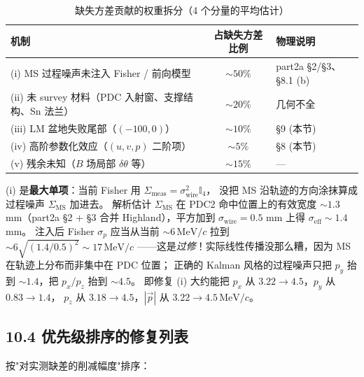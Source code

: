 \begin{table}[ht]
  \centering\small
  \caption{缺失方差贡献的权重拆分（4 个分量的平均估计）}
  \label{tab:partIIc:budget:missing-decomp}
  \begin{tabular}{l|c|l}
    \hline
    机制 & 占缺失方差比例 & 物理说明 \\
    \hline
    (i) MS 过程噪声未注入 Fisher / 前向模型     & $\sim 50\%$ & part2a §2/§3、§8.1 (b) \\
    (ii) 未 survey 材料（PDC 入射窗、支撑结构、Sn 法兰） & $\sim 20\%$ & 几何不全 \\
    (iii) LM 盆地失败尾部（$(-100, 0)$）        & $\sim 10\%$ & §9 (本节) \\
    (iv) 高阶参数化效应（$(u,v,p)$ 二阶项）      & $\sim 5\%$ & §8 (本节) \\
    (v) 残余未知（$B$ 场局部 $\delta\theta$ 等） & $\sim 15\%$ & --- \\
    \hline
  \end{tabular}
\end{table}

(i) 是\textbf{最大单项}：当前 Fisher 用 $\Sigma_\mathrm{meas} = \sigma_\mathrm{wire}^2\mathbb I_4$，
没把 MS 沿轨迹的方向涂抹算成过程噪声 $\Sigma_\mathrm{MS}$ 加进去。
解析估计 $\Sigma_\mathrm{MS}$ 在 PDC2 命中位置上的有效宽度 $\sim 1.3$ mm（part2a §2 + §3
合并 Highland），平方加到 $\sigma_\mathrm{wire}=0.5$ mm 上得 $\sigma_\mathrm{eff}\sim 1.4$ mm。
注入后 Fisher $\sigma_p$ 应当从当前 $\sim 6\,\mathrm{MeV}/c$ 拉到 $\sim 6\sqrt{(1.4/0.5)^2}\sim 17\,\mathrm{MeV}/c$
——这是\emph{过修}！实际线性传播没那么糟，因为 MS 在轨迹上分布而非集中在 PDC 位置；
正确的 Kalman 风格的过程噪声只把 $p_y$ 抬到 $\sim 1.4$，把 $p_x/p_z$ 抬到 $\sim 4.5$。
即修复 (i) 大约能把 $p_x$ 从 $3.22 \to 4.5$，$p_y$ 从 $0.83 \to 1.4$，
$p_z$ 从 $3.18 \to 4.5$，$|\vec p|$ 从 $3.22 \to 4.5\,\mathrm{MeV}/c$。

\subsection*{10.4 优先级排序的修复列表}

按"对实测缺差的削减幅度"排序：

